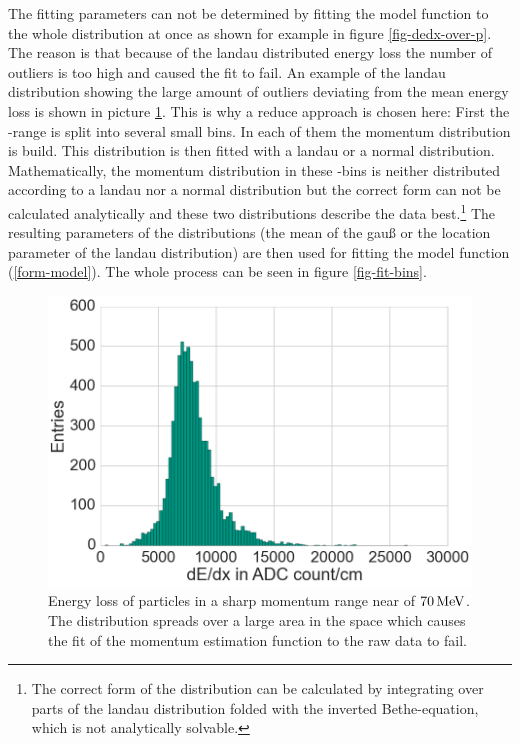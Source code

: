 The fitting parameters can not be determined by fitting the model function to the whole distribution at once as shown for example in figure \ref{fig-dedx-over-p}. The reason is that because of the landau distributed energy loss the number of outliers is too high and caused the fit to fail. An example of the landau distribution showing the large amount of outliers deviating from the mean energy loss is shown in picture \ref{fig-landau}. This is why a reduce approach is chosen here: First the \dedx-range is split into several small bins. In each of them the momentum distribution is build. This distribution is then fitted with a landau or a normal distribution. Mathematically, the momentum distribution in these \dedx-bins is neither distributed according to a landau nor a normal distribution but the correct form can not be calculated analytically and these two distributions describe the data best.\footnote{The correct form of the distribution can be calculated by integrating over parts of the landau distribution folded with the inverted Bethe-equation, which is not analytically solvable.} The resulting parameters of the distributions (the mean of the gauß or the location parameter of the landau distribution\cite{landau}) are then used for fitting the model function (\ref{form-model}). The whole process can be seen in figure \ref{fig-fit-bins}.

\begin{figure}
  \centering
  \includegraphics[width=0.7\linewidth]{figures/vxd/landau.png}
  \caption[Energy loss of particles in a sharp momentum range near of 70 MeV.]{Energy loss of particles in a sharp momentum range near of $\unit[70]{MeV}$. The distribution spreads over a large area in the \dedx space which causes the fit of the momentum estimation function to the raw data to fail.}
  \label{fig-landau}
\end{figure}

